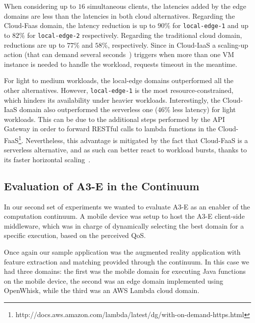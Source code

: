  When considering up to $16$ simultaneous clients, the latencies added by the edge domains are less than the latencies in both cloud alternatives. Regarding the Cloud-Faas domain, the latency reduction is up to $90$\% for \texttt{local-edge-1} and up to $82$\% for \texttt{local-edge-2} respectively. Regarding the traditional cloud domain, reductions are up to $77$\% and $58$\%, respectively. Since in Cloud-IaaS a scaling-up action (that can demand several seconds~\cite{Quatrocchi2016discrete}) triggers when more than one VM instance is needed to handle the workload, requests timeout in the meantime. 
 
 For light to medium workloads, the local-edge domains outperformed all the other alternatives. However, \texttt{local-edge-1} is the most resource-constrained, which hinders its availability under heavier workloads. Interestingly, the Cloud-IaaS domain also outperformed the serverless one ($46$\% less latency) for light workloads. This can be due to the additional steps performed by the API Gateway in order to forward RESTful calls to lambda functions in the Cloud-FaaS\footnote{http://docs.aws.amazon.com/lambda/latest/dg/with-on-demand-https.html}. Nevertheless, this advantage is mitigated by the fact that Cloud-FaaS is a serverless alternative, and as such can better react to workload bursts, thanks to its faster horizontal scaling~\cite{Villamizar2017lambda,Hendrickson:2016}.



\subsection{Evaluation of A3-E in the Continuum} 

In our second set of experiments we wanted to evaluate A3-E as an enabler of the computation continuum. A mobile device was setup to host the A3-E client-side middleware, which was in charge of dynamically selecting the best domain for a specific execution, based on the perceived QoS. 

Once again our sample application was the augmented reality application with feature extraction and matching provided through the continuum. In this case we had three domains: the first was the mobile domain for executing Java functions on the mobile device, the second was an edge domain implemented using OpenWhisk, while the third was an AWS Lambda cloud domain.

